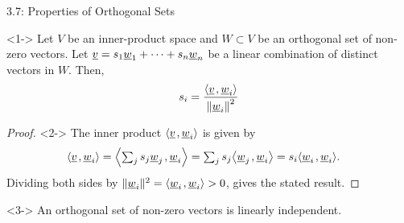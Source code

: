 \documentclass[10pt,letterpaper,english]{beamer}
\begin{document}
\begin{frame}{3.7: Properties of Orthogonal Sets}

\begin{lemma}<1->
Let $V$ be an inner-product space and $W\subset V$ be an orthogonal set of non-zero vectors.
Let $\underline{v} = s_1 \underline{w}_1 + \cdots + s_n \underline{w}_n$ be a linear combination of distinct vectors in $W$.
Then, \vspace{-2mm}
\[ s_i = \frac{ {\left\langle  \underline{v}  \mskip2mu ,  \underline{w}_i  \right\rangle} }
{ \left\| \underline{w}_i \right\|^2 }\]
\end{lemma}

\begin{proof}<2->
The inner product ${\left\langle  \underline{v}  \mskip2mu ,  \underline{w}_i  \right\rangle}$ is given by \vspace{-1mm}
\begin{equation*}
\begin{split}
\inner{ \vecnot{v} }{ \vecnot{w}_i }
&= \inner{ \textstyle\sum_j s_j \vecnot{w}_j }{ \vecnot{w}_i }
= \textstyle\sum_j s_j \inner{ \vecnot{w}_j }{ \vecnot{w}_i }
= s_i \inner{ \vecnot{w}_i }{ \vecnot{w}_i } .
\end{split} \vspace{-1mm}
\end{equation*}
Dividing both sides by $\| \underline{w}_i \|^2 = {\left\langle  \underline{w}_i  \mskip2mu ,  \underline{w}_i  \right\rangle} > 0$, gives the stated result.
\end{proof}

\begin{theorem}<3->
An orthogonal set of non-zero vectors is linearly independent.
\end{theorem}


\end{frame}
\end{document}
